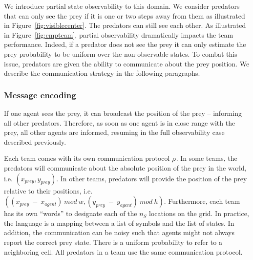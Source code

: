 We introduce partial state observability to this domain. We consider predators that can only see the prey if it is one or two steps away from them as illustrated in Figure~\ref{fig:visiblecenter}. The predators can still see each other. As illustrated in Figure~\ref{fig:cmpteam}, partial observability dramatically impacts the team performance. Indeed, if a predator does not see the prey it can only estimate the prey probability to be uniform over the non-observable states. To combat this issue, predators are given the ability to communicate about the prey position. We describe the communication strategy in the following paragraphs.


\subsubsection*{Message encoding} If one agent sees the prey, it can broadcast the position of the prey -- informing all other predators. Therefore, as soon as one agent is in close range with the prey, all other agents are informed, resuming in the full observability case described previously. %

Each team comes with its own communication protocol $\rho$. In some teams, the predators will communicate about the absolute position of the prey in the world, i.e. $(x_{prey},y_{prey})$. In other teams, predators will provide the position of the prey relative to their positions, i.e. $((x_{prey}~-~x_{agent}) ~mod~w, (y_{prey}~-~y_{agent})~mod~h)$. Furthermore, each team has its own ``words'' to designate each of the $n_S$ locations on the grid. In practice, the language is a mapping between a list of symbols and the list of states. In addition, the communication can be noisy such that agents might not always report the correct prey state. There is a uniform probability to refer to a neighboring cell. All predators in a team use the same communication protocol.

